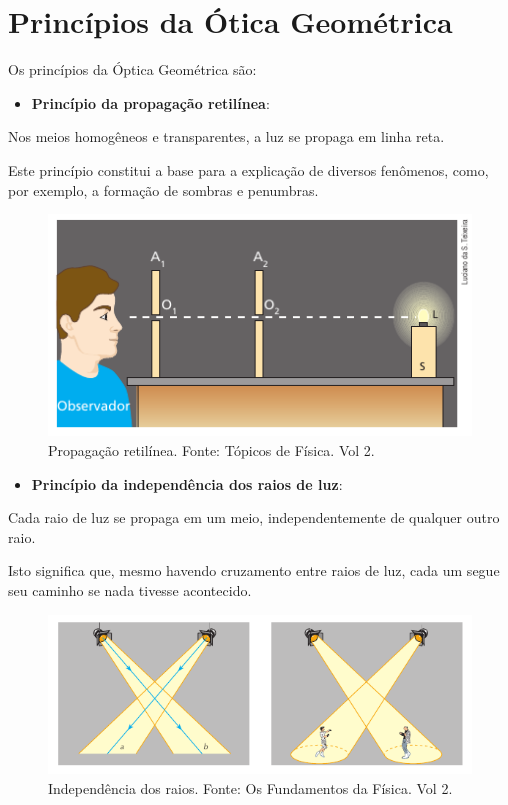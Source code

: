 \documentclass[11pt,twocolumn,oneside]{article}
\begin{document}
\hypertarget{x-princípios-da-ótica-geométrica}{\section{Princípios da Ótica Geométrica}}
Os princípios da Óptica Geométrica são:


\begin{itemize}

\item \textbf{Princípio da propagação retilínea}:

\end{itemize}


Nos meios homogêneos e transparentes, a luz se propaga em linha reta.


Este princípio constitui a base para a explicação de diversos fenômenos, como, por exemplo, a formação de sombras e penumbras.


\begin{figure}[h]{}
\centering\includegraphics[width=2.5truein]{img15.png}
\caption{Propagação retilínea. Fonte: Tópicos de Física. Vol 2.}
\centering
\end{figure}

\begin{itemize}

\item \textbf{Princípio da independência dos raios de luz}:

\end{itemize}


Cada raio de luz se propaga em um meio, independentemente de qualquer outro raio.


Isto significa que, mesmo havendo cruzamento entre raios de luz, cada um segue seu caminho se nada tivesse acontecido.


\begin{figure}[h]{}
\centering\includegraphics[width=2.5truein]{img16.png}
\caption{Independência dos raios. Fonte: Os Fundamentos da Física. Vol 2.}
\centering
\end{figure}
\end{document}
